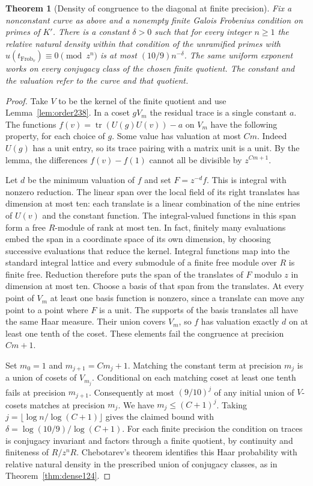 \documentclass[a4paper,11pt]{article}
\newtheorem{theorem}[proposition]{Theorem}
\theoremstyle{definition}
\theoremstyle{remark}
\newcommand{\Frob}{\operatorname{Frob}}\newcommand{\Gal}{\operatorname{Gal}}
\numberwithin{equation}{section}
\begin{document}
\begin{theorem}[Density of congruence to the diagonal at finite precision]
\leavevmode\label{thm:density238}
Fix a nonconstant curve as above and a nonempty finite Galois
Frobenius condition on primes of \(K'\). There is a constant
\(\delta>0\) such that for every integer \(n\ge1\) the relative
natural density within that condition of the unramified primes with
\(u(t_{\Frob_v})\equiv0\pmod{z^n}\) is at most
\((10/9)n^{-\delta}\). The same uniform exponent works on every
conjugacy class of the chosen finite quotient. The constant and the
valuation refer to the curve and that quotient.
\end{theorem}
\begin{proof}
Take \(V\) to be the kernel of the finite quotient and use
Lemma~\ref{lem:order238}. In a coset \(gV_m\) the residual trace is a
single constant \(a\). The functions \(f(v)=\operatorname{tr}(U(g)U(v))-a\)
on \(V_m\) have the following property, for each choice of \(g\).
Some value has valuation at most \(Cm\). Indeed \(U(g)\) has a unit
entry, so its trace pairing with a matrix unit is a unit. By the
lemma, the differences \(f(v)-f(1)\) cannot all be divisible by
\(z^{Cm+1}\).

Let \(d\) be the minimum valuation of \(f\) and set \(F=z^{-d}f\).
This is integral with nonzero reduction. The linear span over the local
field of its right translates has dimension at most ten: each translate
is a linear combination of the nine entries of \(U(v)\) and the
constant function. The integral-valued functions in this span form a
free \(R\)-module of rank at most ten. In fact, finitely many evaluations
embed the span in a coordinate space of its own dimension, by choosing
successive evaluations that reduce the kernel. Integral functions map
into the standard integral lattice and every submodule of a finite
free module over \(R\) is finite free. Reduction therefore puts the
span of the translates of \(F\) modulo \(z\) in dimension at most ten.
Choose a basis of that span from the translates. At every point of
\(V_m\) at least one basis function is nonzero, since a translate can
move any point to a point where \(F\) is a unit. The supports of the
basis translates all have the same Haar measure. Their union covers
\(V_m\), so \(f\) has valuation exactly \(d\) on at least one tenth of
the coset. These elements fail the congruence at precision \(Cm+1\).

Set \(m_0=1\) and \(m_{j+1}=Cm_j+1\). Matching the constant term at
precision \(m_j\) is a union of cosets of \(V_{m_j}\). Conditional on
each matching coset at least one tenth fails at precision \(m_{j+1}\).
Consequently at most \((9/10)^j\) of any initial union of \(V\)-cosets
matches at precision \(m_j\). We have \(m_j\le(C+1)^j\). Taking
\(j=\lfloor\log n/\log(C+1)\rfloor\) gives the claimed bound with
\(\delta=\log(10/9)/\log(C+1)\). For each finite precision the
condition on traces is conjugacy invariant and factors through a
finite quotient, by continuity and finiteness of \(R/z^nR\).
Chebotarev's theorem identifies this Haar probability with relative
natural density in the prescribed union of conjugacy classes, as in
Theorem~\ref{thm:dense124}.
\end{proof}
\end{document}
